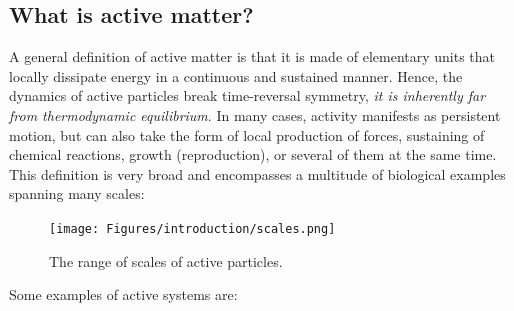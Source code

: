 \label{chapter: introduction}



\subsection{What is active matter?}


A general definition of active matter is that it is made of elementary units that locally dissipate energy in a continuous and sustained manner. Hence, the dynamics of active particles break time-reversal symmetry, \textit{it is inherently far from thermodynamic equilibrium}. In many cases, activity manifests as persistent motion, but can also take the form of local production of forces, sustaining of chemical reactions, growth (reproduction), or several of them at the same time. This definition is very broad and encompasses a multitude of biological examples spanning many scales:

\begin{figure}[!htb]
    \centering
    \texttt{[image: Figures/introduction/scales.png]}
    \caption{The range of scales of active particles.}
    \label{fig: scales active particles}
\end{figure}


Some examples of active systems are:

